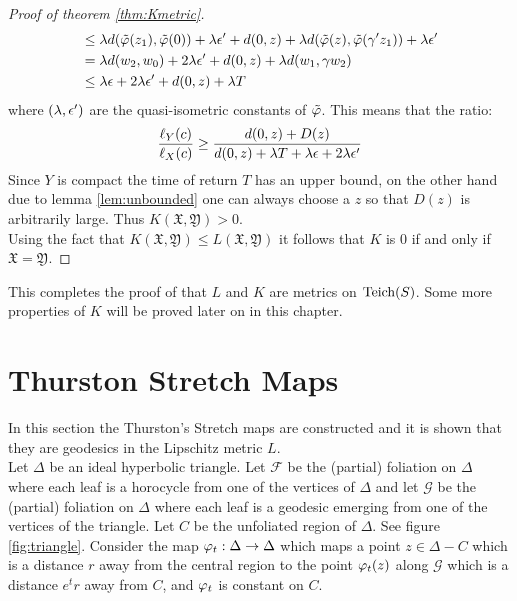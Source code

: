 \begin{proof}[Proof of theorem \ref{thm:Kmetric}]
\begin{align*}
           &\leq \lambda d(\tilde{\varphi}(z_1), \tilde{\varphi}(0)) + \lambda \epsilon'  + d(0,z) + \lambda d(\tilde{\varphi}(z), \tilde{\varphi}(\gamma' z_1)) + \lambda \epsilon'\\
           &= \lambda d(w_2, w_0) + 2\lambda \epsilon' + d(0,z) + \lambda d(w_1, \gamma w_2)\\
           &\leq \lambda \epsilon + 2\lambda \epsilon' + d(0,z) + \lambda T
  \end{align*}
  where $(\lambda,\epsilon')$ are the quasi-isometric constants of $\tilde{\varphi}$. This means that the ratio:
  $$\frac{\ell_Y(c)}{\ell_X(c)} \geq \frac{d(0,z) + D(z)}{d(0,z) + \lambda T + \lambda \epsilon + 2\lambda \epsilon'}$$
  Since $Y$ is compact the time of return $T$ has an upper bound, on the other hand due to lemma \ref{lem:unbounded} one can always choose a $z$ so that $D(z)$ is arbitrarily large. Thus $K( \mathfrak{X}, \mathfrak{Y})>0$.\\

  Using the fact that $K( \mathfrak{X}, \mathfrak{Y})\leq L( \mathfrak{X}, \mathfrak{Y})$ it follows that $K$ is $0$ if and only if $ \mathfrak{X}= \mathfrak{Y}$.
\end{proof}
This completes the proof of that $L$ and $K$ are metrics on $\text{Teich}(S)$. Some more properties of $K$ will be proved later on in this chapter.
\section{Thurston Stretch Maps} %
In this section the Thurston's Stretch maps are constructed and it is shown that they are geodesics in the Lipschitz metric $L$.\\

Let $\Delta$ be an ideal hyperbolic triangle. Let $ \mathscr{F}$ be the (partial) foliation on $\Delta$ where each leaf is a horocycle from one of the vertices of $\Delta$ and let $ \mathscr{G}$ be the (partial) foliation on $\Delta$ where each leaf is a geodesic emerging from one of the vertices of the triangle. Let $C$ be the unfoliated region of $\Delta$. See figure \ref{fig:triangle}. Consider the map $\varphi_t:\Delta \to \Delta$ which maps a point $z\in \Delta - C$ which is a distance $r$ away from the central region to the point $\varphi_t(z)$ along $ \mathscr{G}$ which is a distance $e^t r$ away from $C$, and $\varphi_t$ is constant on $C$.\\

